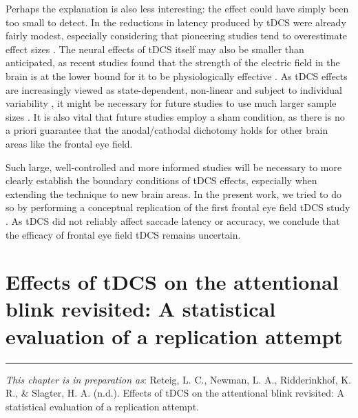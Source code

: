 \documentclass[11pt,]{memoir}
\begin{document}
Perhaps the explanation is also less interesting: the effect could have simply been too small to detect. In \textcite{Kanai2012} the reductions in latency produced by tDCS were already fairly modest, especially considering that pioneering studies tend to overestimate effect sizes \autocite{Ioannidis2008}. The neural effects of tDCS itself may also be smaller than anticipated, as recent studies found that the strength of the electric field in the brain is at the lower bound for it to be physiologically effective \autocites{Huang2017}{Voroslakos2018}. As tDCS effects are increasingly viewed as state-dependent, non-linear \autocites{Fertonani2017}{Bestmann2014} and subject to individual variability \autocites{Li2015b}{Krause2014}, it might be necessary for future studies to use much larger sample sizes \autocite{Minarik2016}. It is also vital that future studies employ a sham condition, as there is no a priori guarantee that the anodal/cathodal dichotomy holds for other brain areas \autocite{Bestmann2017} like the frontal eye field.

Such large, well-controlled and more informed \autocite{Polania2018} studies will be necessary to more clearly establish the boundary conditions of tDCS effects, especially when extending the technique to new brain areas. In the present work, we tried to do so by performing a conceptual replication of the first frontal eye field tDCS study \autocite{Kanai2012}. As tDCS did not reliably affect saccade latency or accuracy, we conclude that the efficacy of frontal eye field tDCS remains uncertain.

\hypertarget{AB-tDCS-EEG}{%
\chapter{Effects of tDCS on the attentional blink revisited: A statistical evaluation of a replication attempt}\label{AB-tDCS-EEG}}


\vspace*{\fill}

\begin{center}\rule{0.5\linewidth}{\linethickness}\end{center}

\small

\noindent
\emph{This chapter is in preparation as}: Reteig, L. C., Newman, L. A., Ridderinkhof, K. R., \& Slagter, H. A. (n.d.). Effects of tDCS on the attentional blink revisited: A statistical evaluation of a replication attempt.
\newpage
\normalsize
\end{document}
